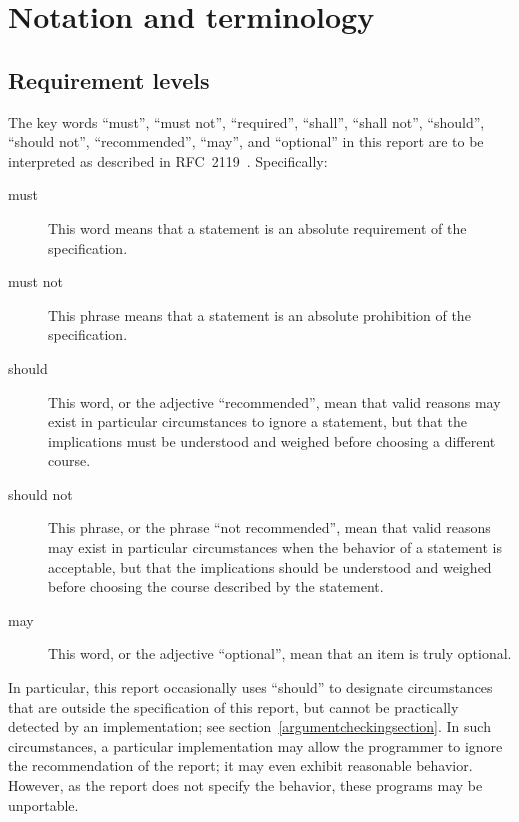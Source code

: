 \chapter{Notation and terminology}
\label{terminologychapter}

\section{Requirement levels} 
\label{requirementsection}

The key words ``must'', ``must not'', ``required'', ``shall'', ``shall
not'', ``should'', ``should not'', ``recommended'', ``may'', and
``optional'' in this report are to be interpreted as described in
RFC~2119~\cite{mustard}.  Specifically:

\begin{description}
\item[must] This word means that a statement is an absolute
  requirement of the specification.
\item[must not] This phrase means that a statement is an absolute
  prohibition of the specification.
\item[should] This word, or the adjective ``recommended'', mean that
  valid reasons may exist in particular circumstances to ignore a
  statement, but that the implications must be understood and weighed
  before choosing a different course.
\item[should not] This phrase, or the phrase ``not recommended'', mean
  that valid reasons may exist in particular circumstances when the
  behavior of a statement is acceptable, but that the implications
  should be understood and weighed before choosing the course described
  by the statement.
\item[may] This word, or the adjective ``optional'', mean that an item
  is truly optional.
\end{description}

In particular, this report occasionally uses ``should'' to designate
circumstances that are outside the specification of this report, but
cannot be practically detected by an implementation; see
section~\ref{argumentcheckingsection}.  In such circumstances, a
particular implementation may allow the programmer to ignore the
recommendation of the report; it may even exhibit reasonable behavior.
However, as the report does not specify the behavior,
these programs may be unportable.

